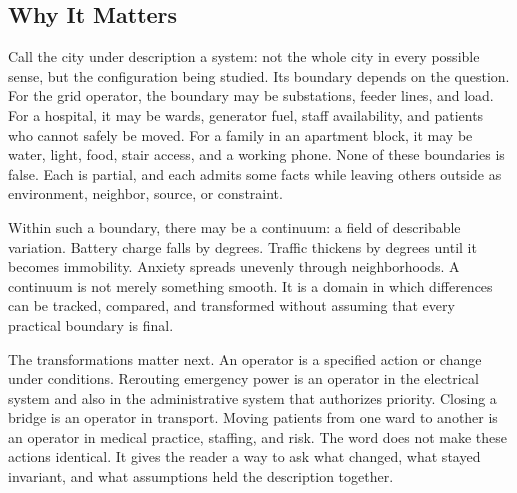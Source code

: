 \documentclass[11pt,a4paper,openany]{book}
\begin{document}
\subsection{Why It Matters}
Call the city under description a system: not the whole city in every possible sense, but the configuration being studied. Its boundary depends on the question. For the grid operator, the boundary may be substations, feeder lines, and load. For a hospital, it may be wards, generator fuel, staff availability, and patients who cannot safely be moved. For a family in an apartment block, it may be water, light, food, stair access, and a working phone. None of these boundaries is false. Each is partial, and each admits some facts while leaving others outside as environment, neighbor, source, or constraint. \cite{kauffman_autocatalytic,raf_networks}\par
Within such a boundary, there may be a continuum: a field of describable variation. Battery charge falls by degrees. Traffic thickens by degrees until it becomes immobility. Anxiety spreads unevenly through neighborhoods. A continuum is not merely something smooth. It is a domain in which differences can be tracked, compared, and transformed without assuming that every practical boundary is final.\par
The transformations matter next. An operator is a specified action or change under conditions. Rerouting emergency power is an operator in the electrical system and also in the administrative system that authorizes priority. Closing a bridge is an operator in transport. Moving patients from one ward to another is an operator in medical practice, staffing, and risk. The word does not make these actions identical. It gives the reader a way to ask what changed, what stayed invariant, and what assumptions held the description together.\par
\end{document}
